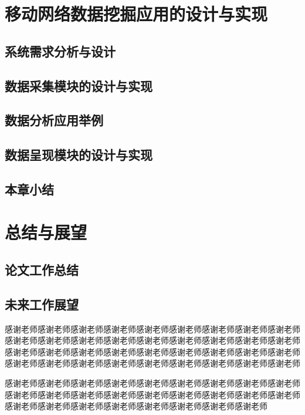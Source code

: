 \documentclass{HustGraduPaper}
\begin{document}
    \section{移动网络数据挖掘应用的设计与实现}
    \subsection{系统需求分析与设计}
    \subsection{数据采集模块的设计与实现}
    \subsection{数据分析应用举例}
    \subsection{数据呈现模块的设计与实现}
    \subsection{本章小结}
    \section{总结与展望}
    \subsection{论文工作总结}
    \subsection{未来工作展望}
    \begin{thankpage}
		感谢老师感谢老师感谢老师感谢老师感谢老师感谢老师感谢老师感谢老师感谢老师感谢老师感谢老师感谢老师感谢老师感谢老师感谢老师感谢老师感谢老师感谢老师感谢老师感谢老师感谢老师感谢老师感谢老师感谢老师感谢老师感谢老师感谢老师感谢老师感谢老师感谢老师感谢老师感谢老师感谢老师感谢老师感谢老师感谢老师
		
		感谢老师感谢老师感谢老师感谢老师感谢老师感谢老师感谢老师感谢老师感谢老师感谢老师感谢老师感谢老师感谢老师感谢老师感谢老师感谢老师感谢老师感谢老师感谢老师感谢老师感谢老师感谢老师感谢老师感谢老师感谢老师感谢老师
	\end{thankpage}
    
    
\end{document}
